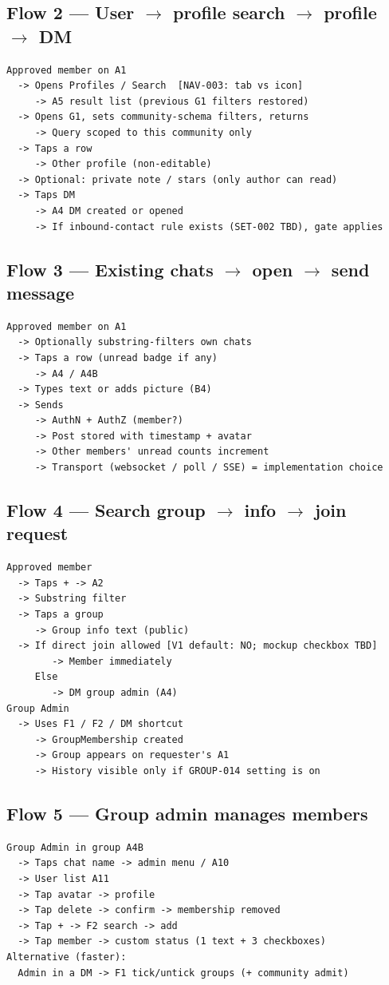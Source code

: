 \documentclass[11pt,a4paper]{article}
\begin{document}
\subsection{Flow 2 --- User $\rightarrow$ profile search $\rightarrow$ profile $\rightarrow$ DM}
\begin{verbatim}
Approved member on A1
  -> Opens Profiles / Search  [NAV-003: tab vs icon]
     -> A5 result list (previous G1 filters restored)
  -> Opens G1, sets community-schema filters, returns
     -> Query scoped to this community only
  -> Taps a row
     -> Other profile (non-editable)
  -> Optional: private note / stars (only author can read)
  -> Taps DM
     -> A4 DM created or opened
     -> If inbound-contact rule exists (SET-002 TBD), gate applies
\end{verbatim}

\subsection{Flow 3 --- Existing chats $\rightarrow$ open $\rightarrow$ send message}
\begin{verbatim}
Approved member on A1
  -> Optionally substring-filters own chats
  -> Taps a row (unread badge if any)
     -> A4 / A4B
  -> Types text or adds picture (B4)
  -> Sends
     -> AuthN + AuthZ (member?)
     -> Post stored with timestamp + avatar
     -> Other members' unread counts increment
     -> Transport (websocket / poll / SSE) = implementation choice
\end{verbatim}

\subsection{Flow 4 --- Search group $\rightarrow$ info $\rightarrow$ join request}
\begin{verbatim}
Approved member
  -> Taps + -> A2
  -> Substring filter
  -> Taps a group
     -> Group info text (public)
  -> If direct join allowed [V1 default: NO; mockup checkbox TBD]
        -> Member immediately
     Else
        -> DM group admin (A4)
Group Admin
  -> Uses F1 / F2 / DM shortcut
     -> GroupMembership created
     -> Group appears on requester's A1
     -> History visible only if GROUP-014 setting is on
\end{verbatim}

\subsection{Flow 5 --- Group admin manages members}
\begin{verbatim}
Group Admin in group A4B
  -> Taps chat name -> admin menu / A10
  -> User list A11
  -> Tap avatar -> profile
  -> Tap delete -> confirm -> membership removed
  -> Tap + -> F2 search -> add
  -> Tap member -> custom status (1 text + 3 checkboxes)
Alternative (faster):
  Admin in a DM -> F1 tick/untick groups (+ community admit)
\end{verbatim}
\end{document}
